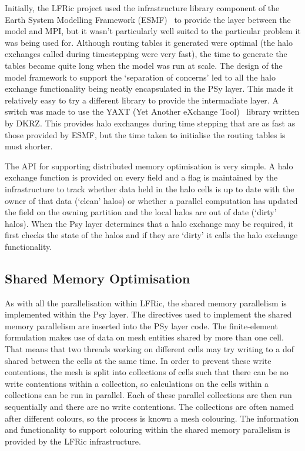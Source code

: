 \documentclass[times]{elsarticle}
\begin{document}
Initially, the LFRic project used the infrastructure library component
of the Earth System Modelling Framework (ESMF)~\cite{ESMFDocs} to
provide the layer between the model and MPI, but it wasn't particularly
well suited to the particular problem it was being used for. Although
routing tables it generated were optimal (the halo exchanges called
during timestepping were very fast), the time to generate the tables
became quite long when the model was run at scale. The design of the
model framework to support the `separation of concerns' led to all the
halo exchange functionality being neatly encapsulated in the PSy layer.
This made it relatively easy to try a different library to provide the
intermadiate layer. A switch was made to use the YAXT (Yet Another
eXchange Tool)~\cite{YAXTDocs} library written by DKRZ. This provides
halo exchanges during time stepping that are as fast as those provided
by ESMF, but the time taken to initialise the routing tables is must
shorter. 

The API for supporting distributed memory optimisation is very simple. A
halo exchange function is provided on every field and a flag is
maintained by the infrastructure to track whether data held in the halo
cells is up to date with the owner of that data (`clean' halos) or
whether a parallel computation has updated the field on the owning
partition and the local halos are out of date (`dirty' halos). When the
Psy layer determines that a halo exchange may be required, it first
checks the state of the halos and if they are `dirty' it calls the halo
exchange functionality.

\subsection{\label{sec:sharedmem}Shared Memory Optimisation}

As with all the parallelisation within LFRic, the shared memory
parallelism is implemented within the Psy layer. The directives used to
implement the shared memory parallelism are inserted into the PSy layer
code. The finite-element formulation makes use of data on mesh entities
shared by more than one cell. That means that two threads working on
different cells may try writing to a dof shared between the cells at the
same time. In order to prevent these write contentions, the mesh is
split into collections of cells such that there can be no write
contentions within a collection, so calculations on the cells within a
collections can be run in parallel. Each of these parallel collections
are then run sequentially and there are no write contentions. The
collections are often named after different colours, so the process is
known a mesh colouring. The information and functionality to support
colouring within the shared memory parallelism is provided by the LFRic
infrastructure.
\end{document}

